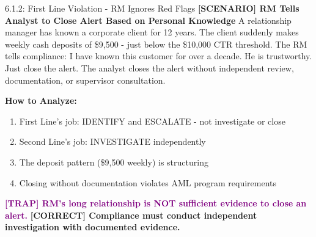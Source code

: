 \documentclass[11pt,a4paper]{beamer}
\newcommand{\trap}[1]{\textcolor{purple}{\textbf{[TRAP] #1}}}
\newcommand{\correct}[1]{\textcolor{green!50!black}{\textbf{[CORRECT] #1}}}
\newcommand{\scenario}[1]{\textcolor{blue!70!black}{\textbf{[SCENARIO] #1}}}
\begin{document}
\begin{frame}{6.1.2: First Line Violation - RM Ignores Red Flags}
	\scenario{RM Tells Analyst to Close Alert Based on Personal Knowledge}
	A relationship manager has known a corporate client for 12 years. The client suddenly makes weekly cash deposits of \$9,500 - just below the \$10,000 CTR threshold. The RM tells compliance: I have known this customer for over a decade. He is trustworthy. Just close the alert. The analyst closes the alert without independent review, documentation, or supervisor consultation.
	
	\vspace{0.1cm}
	\textbf{How to Analyze:}
	\begin{enumerate}
		\item First Line's job: IDENTIFY and ESCALATE - not investigate or close
		\item Second Line's job: INVESTIGATE independently
		\item The deposit pattern (\$9,500 weekly) is structuring
		\item Closing without documentation violates AML program requirements
	\end{enumerate}
	\trap{RM's long relationship is NOT sufficient evidence to close an alert.}
	\correct{Compliance must conduct independent investigation with documented evidence.}
\end{frame}
\end{document}
